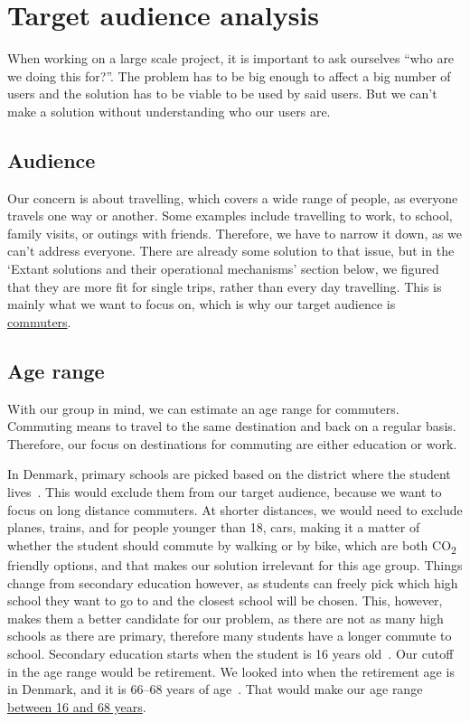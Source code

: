 \section{Target audience analysis}\label{sec:target-audience-analysis}

When working on a large scale project, it is important to ask ourselves ``who are we doing this for?''.
The problem has to be big enough to affect a big number of users and the solution has to be viable to be used by said
users.
But we can't make a solution without understanding who our users are.

\subsection{Audience}\label{subsec:audience}

Our concern is about travelling, which covers a wide range of people, as everyone travels one way or another.
Some examples include travelling to work, to school, family visits, or outings with friends.
Therefore, we have to narrow it down, as we can't address everyone.
There are already some solution to that issue, but in the `Extant solutions and their operational mechanisms' section
below, we figured that they are more fit for single trips, rather than every day travelling.
This is mainly what we want to focus on, which is why our target audience is \underline{commuters}.

\subsection{Age range}\label{subsec:age-range}

With our group in mind, we can estimate an age range for commuters.
Commuting means to travel to the same destination and back on a regular basis.
Therefore, our focus on destinations for commuting are either education or work.

In Denmark, primary schools are picked based on the district where the student lives~\cite{primary_school}.
This would exclude them from our target audience, because we want to focus on long distance commuters.
At shorter distances, we would need to exclude planes, trains, and for people younger than 18, cars, making it a matter
of whether the student should commute by walking or by bike, which are both \unit{CO_{2}} friendly options, and that
makes our solution irrelevant for this age group.
Things change from secondary education however, as students can freely pick which high school they want to go to and the
closest school will be chosen.
This, however, makes them a better candidate for our problem, as there are not as many high schools as there are primary,
therefore many students have a longer commute to school.
Secondary education starts when the student is 16 years old~\cite{secondary_school}.
Our cutoff in the age range would be retirement.
We looked into when the retirement age is in Denmark, and it is 66--68 years of age~\cite{retirement}.
That would make our age range \underline{between 16 and 68 years}.

